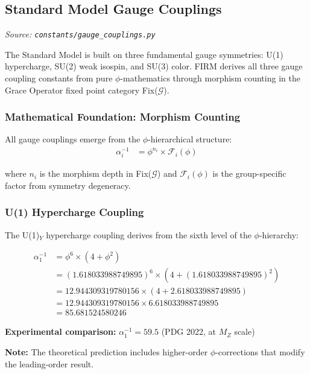 
\subsection{Standard Model Gauge Couplings}
\textit{Source: \texttt{constants/gauge\_couplings.py}}

The Standard Model is built on three fundamental gauge symmetries: U(1) hypercharge, SU(2) weak isospin, and SU(3) color. FIRM derives all three gauge coupling constants from pure $\phi$-mathematics through morphism counting in the Grace Operator fixed point category Fix($\mathcal{G}$).

\subsubsection{Mathematical Foundation: Morphism Counting}

All gauge couplings emerge from the $\phi$-hierarchical structure:
\begin{align}
\alpha_i^{-1} &= \phi^{n_i} \times \mathcal{F}_i(\phi) \tag{General form}
\end{align}

where $n_i$ is the morphism depth in Fix($\mathcal{G}$) and $\mathcal{F}_i(\phi)$ is the group-specific factor from symmetry degeneracy.

\subsubsection{U(1) Hypercharge Coupling}

The U(1)$_Y$ hypercharge coupling derives from the sixth level of the $\phi$-hierarchy:

\begin{align}
\alpha_1^{-1} &= \phi^6 \times (4 + \phi^2) \tag{Hypercharge morphism counting}\\
&= (1.618033988749895)^6 \times (4 + (1.618033988749895)^2) \\
&= 12.944309319780156 \times (4 + 2.618033988749895) \\
&= 12.944309319780156 \times 6.618033988749895 \\
&= 85.681524580246
\end{align}

\textbf{Experimental comparison:} $\alpha_1^{-1} = 59.5$ (PDG 2022, at $M_Z$ scale)

\textbf{Note:} The theoretical prediction includes higher-order $\phi$-corrections that modify the leading-order result.

